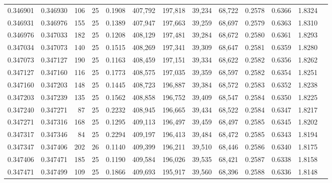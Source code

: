 \begin{tabular}{rrrrrrrrrrrrr}
0.346901 & 0.346930 &   106 &  25 &                                     0.1908 & 407,792 & 197,818 &  39,234 &  68,722 & 0.2578 & 0.6366 & 1.8324 \\
0.346931 & 0.346976 &   155 &  25 &                                     0.1389 & 407,947 & 197,663 &  39,259 &  68,697 & 0.2579 & 0.6363 & 1.8310 \\
0.346976 & 0.347033 &   182 &  25 &                                     0.1208 & 408,129 & 197,481 &  39,284 &  68,672 & 0.2580 & 0.6361 & 1.8293 \\
0.347034 & 0.347073 &   140 &  25 &                                     0.1515 & 408,269 & 197,341 &  39,309 &  68,647 & 0.2581 & 0.6359 & 1.8280 \\
0.347073 & 0.347127 &   190 &  25 &                                     0.1163 & 408,459 & 197,151 &  39,334 &  68,622 & 0.2582 & 0.6356 & 1.8262 \\
0.347127 & 0.347160 &   116 &  25 &                                     0.1773 & 408,575 & 197,035 &  39,359 &  68,597 & 0.2582 & 0.6354 & 1.8251 \\
0.347160 & 0.347203 &   148 &  25 &                                     0.1445 & 408,723 & 196,887 &  39,384 &  68,572 & 0.2583 & 0.6352 & 1.8238 \\
0.347203 & 0.347239 &   135 &  25 &                                     0.1562 & 408,858 & 196,752 &  39,409 &  68,547 & 0.2584 & 0.6350 & 1.8225 \\
0.347240 & 0.347271 &    87 &  25 &                                     0.2232 & 408,945 & 196,665 &  39,434 &  68,522 & 0.2584 & 0.6347 & 1.8217 \\
0.347271 & 0.347316 &   168 &  25 &                                     0.1295 & 409,113 & 196,497 &  39,459 &  68,497 & 0.2585 & 0.6345 & 1.8202 \\
0.347317 & 0.347346 &    84 &  25 &                                     0.2294 & 409,197 & 196,413 &  39,484 &  68,472 & 0.2585 & 0.6343 & 1.8194 \\
0.347347 & 0.347406 &   202 &  26 &                                     0.1140 & 409,399 & 196,211 &  39,510 &  68,446 & 0.2586 & 0.6340 & 1.8175 \\
0.347406 & 0.347471 &   185 &  25 &                                     0.1190 & 409,584 & 196,026 &  39,535 &  68,421 & 0.2587 & 0.6338 & 1.8158 \\
0.347471 & 0.347499 &   109 &  25 &                                     0.1866 & 409,693 & 195,917 &  39,560 &  68,396 & 0.2588 & 0.6336 & 1.8148 \\

\end{tabular}
